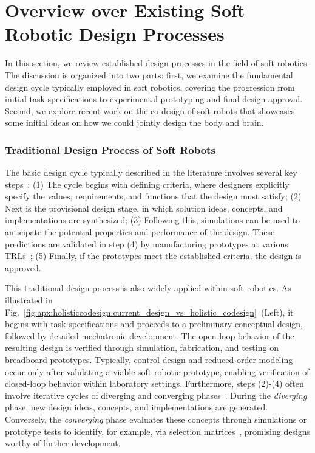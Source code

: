 \section{Overview over Existing Soft Robotic Design Processes}\label{sec:apx:holisticcodesign:related_work}

In this section, we review established design processes in the field of soft robotics. The discussion is organized into two parts: first, we examine the fundamental design cycle typically employed in soft robotics, covering the progression from initial task specifications to experimental prototyping and final design approval. Second, we explore recent work on the co-design of soft robots that showcases some initial ideas on how we could jointly design the body and brain.

\subsubsection{Traditional Design Process of Soft Robots}
The basic design cycle typically described in the literature involves several key steps~\citep{roozenburg1995product, van2020delft}: (1) The cycle begins with defining criteria, where designers explicitly specify the values, requirements, and functions that the design must satisfy; (2) Next is the provisional design stage, in which solution ideas, concepts, and implementations are synthesized; (3) Following this, simulations can be used to anticipate the potential properties and performance of the design. These predictions are validated in step (4) by manufacturing prototypes at various \glspl{TRL}~\citep{NASA_TRL}; (5) Finally, if the prototypes meet the established criteria, the design is approved.

This traditional design process is also widely applied within soft robotics. As illustrated in Fig.~\ref{fig:apx:holisticcodesign:current_design_vs_holistic_codesign}~(Left), it begins with task specifications and proceeds to a preliminary conceptual design, followed by detailed mechatronic development. The open-loop behavior of the resulting design is verified through simulation, fabrication, and testing on breadboard prototypes. Typically, control design and reduced-order modeling occur only after validating a viable soft robotic prototype, enabling verification of closed-loop behavior within laboratory settings. Furthermore, steps (2)-(4) often involve iterative cycles of diverging and converging phases~\citep{feldhusen2013pahl}. During the \emph{diverging} phase, new design ideas, concepts, and implementations are generated. Conversely, the \emph{converging} phase evaluates these concepts through simulations or prototype tests to identify, for example, via selection matrices~\citep{ulrich2016product}, promising designs worthy of further development.

